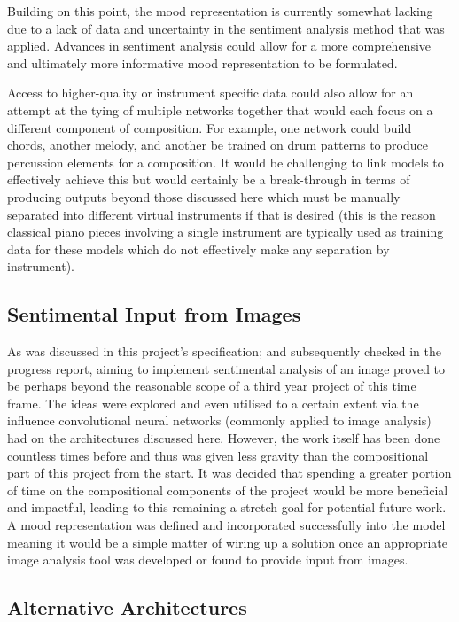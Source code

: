 \documentclass[12pt,]{article}
\begin{document}
Building on this point, the mood representation is currently somewhat
lacking due to a lack of data and uncertainty in the sentiment analysis
method that was applied. Advances in sentiment analysis could allow for
a more comprehensive and ultimately more informative mood representation
to be formulated.

Access to higher-quality or instrument specific data could also allow
for an attempt at the tying of multiple networks together that would
each focus on a different component of composition. For example, one
network could build chords, another melody, and another be trained on
drum patterns to produce percussion elements for a composition. It would
be challenging to link models to effectively achieve this but would
certainly be a break-through in terms of producing outputs beyond those
discussed here which must be manually separated into different virtual
instruments if that is desired (this is the reason classical piano
pieces involving a single instrument are typically used as training data
for these models which do not effectively make any separation by
instrument).

\hypertarget{sentimental-input-from-images}{%
\subsection{Sentimental Input from
Images}\label{sentimental-input-from-images}}

As was discussed in this project's specification; and subsequently
checked in the progress report, aiming to implement sentimental analysis
of an image proved to be perhaps beyond the reasonable scope of a third
year project of this time frame. The ideas were explored and even
utilised to a certain extent via the influence convolutional neural
networks (commonly applied to image analysis) had on the architectures
discussed here. However, the work itself has been done countless times
before and thus was given less gravity than the compositional part of
this project from the start. It was decided that spending a greater
portion of time on the compositional components of the project would be
more beneficial and impactful, leading to this remaining a stretch goal
for potential future work. A mood representation was defined and
incorporated successfully into the model meaning it would be a simple
matter of wiring up a solution once an appropriate image analysis tool
was developed or found to provide input from images.

\hypertarget{alternative-architectures}{%
\subsection{Alternative Architectures}\label{alternative-architectures}}
\end{document}
